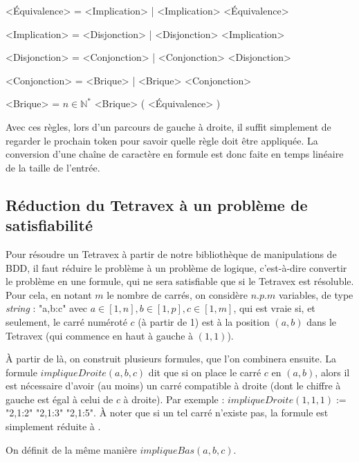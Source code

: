 \documentclass[11pt]{article}
\begin{document}
\setlength{\grammarparsep}{0.3em}
\begin{grammar}

<Équivalence> = <Implication> | <Implication> \Leftrightarrow{} <Équivalence>

<Implication> = <Disjonction> | <Disjonction> \Rightarrow{} <Implication>

<Disjonction> = <Conjonction> | <Conjonction> \lor{} <Disjonction>

<Conjonction> = <Brique> | <Brique> \land{} <Conjonction>

<Brique> = $n \in{} \mathbb{N}^{*}$
\alt \top
\alt \bot
\alt \neg <Brique>
\alt ( <Équivalence> )

\end{grammar}

Avec ces règles, lors d'un parcours de gauche à droite, il suffit simplement de regarder le prochain token pour savoir quelle règle doit être appliquée.
La conversion d'une chaîne de caractère en formule est donc faite en temps linéaire de la taille de l'entrée.

\subsection{Réduction du Tetravex à un problème de satisfiabilité}

Pour résoudre un Tetravex à partir de notre bibliothèque de manipulations de BDD, il faut réduire le problème à un problème de logique, c'est-à-dire convertir le problème en une formule, qui ne sera satisfiable que si le Tetravex est résoluble.
Pour cela, en notant $m$ le nombre de carrés, on considère $n.p.m$ variables, de type \textit{string} : {\NoAutoSpaceBeforeFDP{}"a,b:c"} avec $a \in{} [1, n], b \in{} [1, p], c \in{} [1, m]$, qui est vraie si, et seulement, le carré numéroté $c$ (à partir de 1) est à la position $(a, b)$ dans le Tetravex (qui commence en haut à gauche à $(1, 1)$).

À partir de là, on construit plusieurs formules, que l'on combinera ensuite.
La formule $impliqueDroite(a, b, c)$ dit que si on place le carré $c$ en $(a, b)$, alors il est nécessaire d'avoir (au moins) un carré compatible à droite (dont le chiffre à gauche est égal à celui de $c$ à droite).
Par exemple : $impliqueDroite(1, 1, 1) :=$ {\NoAutoSpaceBeforeFDP{}"2,1:2" \lor{} "2,1:3" \lor{} "2,1:5"}.
À noter que si un tel carré n'existe pas, la formule est simplement réduite à \bot{}.

On définit de la même manière $impliqueBas(a, b, c)$.
\end{document}
